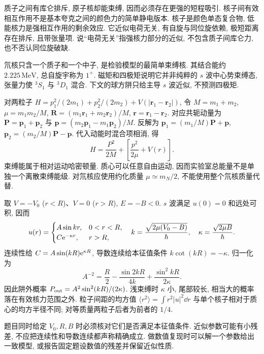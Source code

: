 \label{ch:deuteron}
质子之间有库仑排斥, 原子核却能束缚, 因而必须存在更强的短程吸引. 核子间有效相互作用不是基本夸克之间的颜色力的简单静电版本. 核子是颜色单态复合物, 低能核力是强相互作用的剩余效应. 它近似电荷无关, 有自旋与同位旋依赖, 极短距离存在排斥, 且带张量项. 说``电荷无关''指强核力部分的近似, 不包含质子间库仑力, 也不否认同位旋破缺.

氘核只含一个质子和一个中子, 是检验模型的最简单束缚核. 其结合能约 $2.225\,\mathrm{MeV}$, 总自旋宇称为 $1^+$. 磁矩和四极矩说明它并非纯粹的 $s$ 波中心势束缚态, 张量力使 ${}^3S_1$ 与 ${}^3D_1$ 混合. 下文的球方阱只给主导 $s$ 波近似, 不预测四极矩.

对两粒子 $H=p_1^2/(2m_1)+p_2^2/(2m_2)+V(|\mathbf r_1-\mathbf r_2|)$, 令
$M=m_1+m_2$, $\mu=m_1m_2/M$, $\mathbf R=(m_1\mathbf r_1+m_2\mathbf r_2)/M$, $\mathbf r=\mathbf r_1-\mathbf r_2$. 对应共轭动量为 $\mathbf P=\mathbf p_1+\mathbf p_2$ 与 $\mathbf p=(m_2\mathbf p_1-m_1\mathbf p_2)/M$. 反解为 $\mathbf p_1=(m_1/M)\mathbf P+\mathbf p$, $\mathbf p_2=(m_2/M)\mathbf P-\mathbf p$. 代入动能时混合项相消, 得
\begin{equation}
 H=\frac{P^2}{2M}+\left[\frac{p^2}{2\mu}+V(r)\right].
\end{equation}
束缚能属于相对运动哈密顿量. 质心可以任意自由运动, 因而实验室总能量不是单独一个离散束缚能级. 对氘核应使用约化质量 $\mu\simeq m_N/2$, 不能使用整个氘核质量代替.

取 $V=-V_0$ ($r<R$)、$V=0$ ($r>R$), $E=-B<0$. $s$ 波满足 $u(0)=0$ 和远处可积, 因而
\begin{equation}
 u(r)=\begin{cases}A\sin kr,&0<r<R,\\ C\mathrm e^{-\kappa r},&r>R,\end{cases}
 \quad k=\frac{\sqrt{2\mu(V_0-B)}}\hbar,\quad\kappa=\frac{\sqrt{2\mu B}}\hbar.
\end{equation}
连续性给 $C=A\sin(kR)\mathrm e^{\kappa R}$, 导数连续给本征值条件 $k\cot(kR)=-\kappa$. 归一化为
\begin{equation}\label{eq:deuteron-norm}
 A^{-2}=\frac R2-\frac{\sin2kR}{4k}+\frac{\sin^2kR}{2\kappa}.
\end{equation}
因此阱外概率 $P_{\rm out}=A^2\sin^2(kR)/(2\kappa)$. 浅束缚时 $\kappa$ 小, 尾部较长, 相当大的概率落在有效核力范围之外. 粒子间距的均方值 $\langle r^2\rangle=\int r^2|u|^2\dd r$ 与单个核子相对于质心的均方半径不同; 对等质量两粒子后者为前者的 $1/4$.

题目同时给定 $V_0,R,B$ 时必须核对它们是否满足本征值条件. 近似参数可能有小残差, 不应把连续性和导数连续都声称精确成立. 做数值复现时可以解一个参数给出一致模型, 或报告固定题设数值的残差并保留近似性质.

